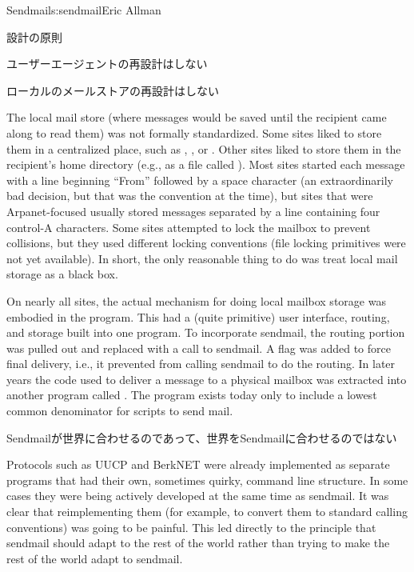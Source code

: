 \begin{aosachapter}{Sendmail}{s:sendmail}{Eric Allman}
\begin{aosasect1}{設計の原則}
\begin{aosasect2}{ユーザーエージェントの再設計はしない}
\end{aosasect2}

\begin{aosasect2}{ローカルのメールストアの再設計はしない}

The local mail store (where messages would be saved until the
recipient came along to read them) was not formally standardized. Some sites
liked to store them in a centralized place, such as ,
, or . Other sites liked to
store them in the recipient's home directory (e.g., as a file called
). Most sites started each message with a line beginning
``From'' followed by a space character (an extraordinarily bad
decision, but that was the convention at the time), but sites that
were Arpanet-focused usually stored messages separated by a line
containing four control-A characters. Some sites attempted to lock the
mailbox to prevent collisions, but they used different locking
conventions (file locking primitives were not yet available). In
short, the only reasonable thing to do was treat local mail storage as
a black box.

On nearly all sites, the actual mechanism for doing local mailbox
storage was embodied in the  program. This had a
(quite primitive) user interface, routing, and storage built into one
program. To incorporate sendmail, the routing portion was pulled out
and replaced with a call to sendmail.  A  flag was added to
force final delivery, i.e., it prevented  from calling
sendmail to do the routing. In later years the code used to deliver a
message to a physical mailbox was extracted into another program
called . The  program exists today
only to include a lowest common denominator for scripts to send
mail.

\end{aosasect2}

\begin{aosasect2}{Sendmailが世界に合わせるのであって、世界をSendmailに合わせるのではない}

Protocols such as UUCP and BerkNET were already implemented as
separate programs that had their own, sometimes quirky, command line
structure. In some cases they were being actively developed at the
same time as sendmail. It was clear that reimplementing them (for
example, to convert them to standard calling conventions) was going to
be painful. This led directly to the principle that sendmail should
adapt to the rest of the world rather than trying to make the rest of
the world adapt to sendmail.


\end{aosasect2}
\end{aosasect1}
\end{aosachapter}
